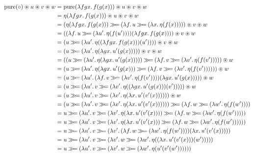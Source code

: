 \setcounter{TemporaryCounter}{\value{equation}}
\setcounter{equation}{0}
\NoChapterPrefix
\begin{align}
  \pure(\circ) \circledast u \circledast v \circledast w
  &= \pure(\lam{f g x}{f(g(x))}) \circledast u \circledast v \circledast w \\
  &= \eta(\lam{f g x}{f(g(x))}) \circledast u \circledast v \circledast w \\
  &= (\eta(\lam{f g x}{f(g(x))}) \hsbind (\lam{f}{u \hsbind (\lam{x}{\eta(f(x))})})) \circledast v \circledast w \\
  &= ((\lam{f}{u \hsbind (\lam{u'}{\eta(f(u'))})})(\lam{f g x}{f(g(x))})) \circledast v \circledast w \\
  &= (u \hsbind (\lam{u'}{\eta((\lam{f g x}{f(g(x))})(u'))})) \circledast v \circledast w \\
  &= (u \hsbind (\lam{u'}{\eta(\lam{g x}{u'(g(x))})})) \circledast v \circledast w \\
  &= ((u \hsbind (\lam{u'}{\eta(\lam{g x}{u'(g(x))})})) \hsbind (\lam{f}{v \hsbind (\lam{v'}{\eta(f(v'))})})) \circledast w \\
  &= (u \hsbind (\lam{u'}{\eta(\lam{g x}{u'(g(x))}) \hsbind (\lam{f}{v \hsbind (\lam{v'}{\eta(f(v'))})})})) \circledast w \\
  &= (u \hsbind (\lam{u'}{(\lam{f}{v \hsbind (\lam{v'}{\eta(f(v'))})})(\lam{g x}{u'(g(x))})})) \circledast w \\
  &= (u \hsbind (\lam{u'}{v \hsbind (\lam{v'}{\eta((\lam{g x}{u'(g(x))})(v'))})})) \circledast w \\
  &= (u \hsbind (\lam{u'}{v \hsbind (\lam{v'}{\eta(\lam{x}{u'(v'(x))})})})) \circledast w \\
  &= (u \hsbind (\lam{u'}{v \hsbind (\lam{v'}{\eta(\lam{x}{u'(v'(x))})})})) \hsbind (\lam{f}{w \hsbind (\lam{w'}{\eta(f(w'))})}) \\
  &= u \hsbind (\lam{u'}{v \hsbind (\lam{v'}{\eta(\lam{x}{u'(v'(x))})}) \hsbind (\lam{f}{w \hsbind (\lam{w'}{\eta(f(w'))})})}) \\
  &= u \hsbind (\lam{u'}{v \hsbind (\lam{v'}{\eta(\lam{x}{u'(v'(x))}) \hsbind (\lam{f}{w \hsbind (\lam{w'}{\eta(f(w'))})})})}) \\
  &= u \hsbind (\lam{u'}{v \hsbind (\lam{v'}{(\lam{f}{w \hsbind (\lam{w'}{\eta(f(w'))})})(\lam{x}{u'(v'(x))})})}) \\
  &= u \hsbind (\lam{u'}{v \hsbind (\lam{v'}{w \hsbind (\lam{w'}{\eta((\lam{x}{u'(v'(x))})(w'))})})}) \\
  &= u \hsbind (\lam{u'}{v \hsbind (\lam{v'}{w \hsbind (\lam{w'}{\eta(u'(v'(w')))})})}) \\

\end{align}
